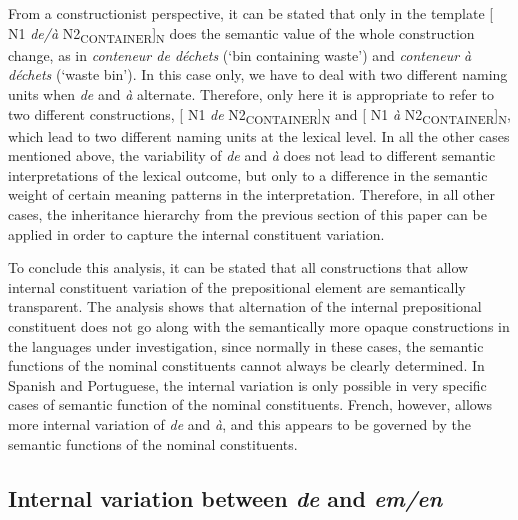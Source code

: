 \documentclass[output=paper]{langsci/langscibook}
\begin{document}
From a constructionist perspective, it can be stated that only in the template [ N1 \textit{de/à} N2\textsubscript{CONTAINER}]\textsubscript{N} does the semantic value of the whole construction change, as in \textit{conteneur de déchets} (`bin containing waste') and \textit{conteneur à déchets} (`waste bin'). In this case only, we have to deal with two different naming units when \textit{de} and \textit{à} alternate. Therefore, only here it is appropriate to refer to two different constructions, [ N1 \textit{de} N2\textsubscript{CONTAINER}]\textsubscript{N} and  [ N1 \textit{à} N2\textsubscript{CONTAINER}]\textsubscript{N}, which lead to two different naming units at the lexical level. In all the other cases mentioned above, the variability of \textit{de} and \textit{à} does not lead to different semantic interpretations of the lexical outcome, but only to a difference in the semantic weight of certain meaning patterns in the interpretation. Therefore, in all other cases, the inheritance hierarchy from the previous section of this paper can be applied in order to capture the internal constituent variation.

To conclude this analysis, it can be stated that all constructions that allow internal constituent variation of the prepositional element are semantically transparent.  The analysis shows that alternation of the internal prepositional constituent does not go along with the semantically more opaque constructions in the languages under investigation, since normally in these cases, the semantic functions of the nominal constituents cannot always be clearly determined. In Spanish and Portuguese, the internal variation is only possible in very specific cases of semantic function of the nominal constituents. French, however, allows more internal variation of \textit{de} and \textit{à}, and this appears to be governed by the semantic functions of the nominal constituents.

\subsection{Internal variation between \textit{de} and \textit{em/en}}
\end{document}
